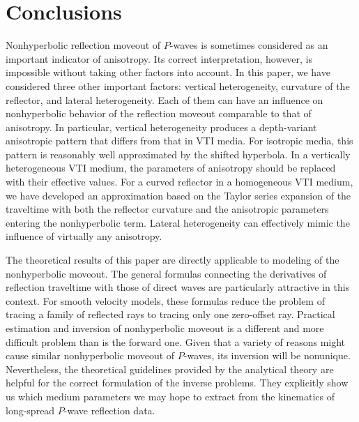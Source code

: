 \section{Conclusions}
Nonhyperbolic reflection moveout of $P$-waves is sometimes considered as
an important indicator of anisotropy. Its correct interpretation,
however, is impossible without taking other factors into account. In
this paper, we have considered three other important factors: vertical
heterogeneity, curvature of the reflector, and lateral heterogeneity.
Each of them can have an influence on nonhyperbolic
behavior of the reflection moveout comparable to that of anisotropy.
In particular, vertical heterogeneity produces a depth-variant
anisotropic pattern that differs from that in VTI media. For
isotropic media, this pattern is reasonably well approximated by the
shifted hyperbola. In a vertically heterogeneous VTI medium, the
parameters of anisotropy should be replaced with their effective
values. For a curved reflector in a homogeneous VTI
medium, we have developed an approximation based on the Taylor series
expansion of the traveltime with both the reflector curvature and the
anisotropic parameters entering the nonhyperbolic term. Lateral
heterogeneity can effectively mimic the influence of virtually any
anisotropy.
\par
The theoretical results of this paper are directly applicable to  
modeling of the nonhyperbolic moveout. The general formulas connecting 
the derivatives of reflection traveltime with those of direct waves are
particularly attractive in this context. For smooth velocity models, 
these formulas reduce the problem of tracing a family of reflected 
rays to tracing only one zero-offset ray. Practical estimation and inversion 
of nonhyperbolic moveout is a different and more difficult problem than is
the forward one. Given that a variety of reasons might cause similar 
nonhyperbolic moveout of $P$-waves, its inversion will be nonunique.  
Nevertheless, the theoretical guidelines provided by the analytical theory 
are helpful for the correct formulation of the inverse problems. They 
explicitly show us which medium parameters we may hope to extract from
the kinematics of long-spread $P$-wave reflection data.

